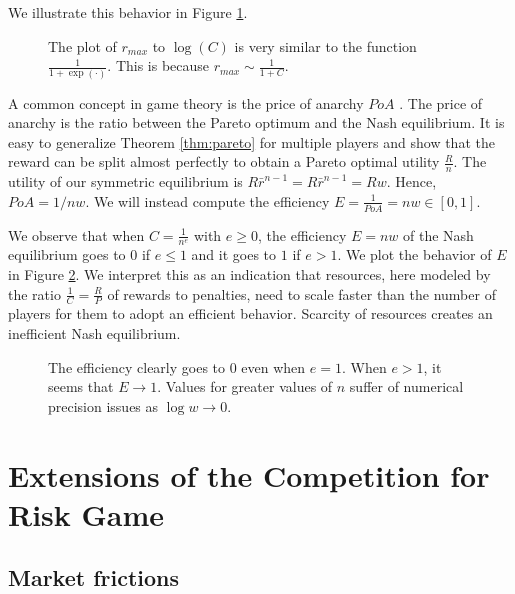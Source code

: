 \documentclass[preprint,12pt,authoryear]{elsarticle}
\theoremstyle{definition}
\begin{document}
We illustrate this behavior in Figure \ref{fig:cutoff-asymptotic}.

\begin{figure}[htbp]
    \centering
    
    \caption{The plot of $r_{max}$ to $\log(C)$ is very similar to the function $\frac{1}{1 + \exp(\cdot)}$. This is because $r_{max} \sim \frac{1}{1+C}$.}
    \label{fig:cutoff-asymptotic}
\end{figure}



A common concept in game theory is the price of anarchy $PoA$ \citep{koutsoupias1999worst}. The price of anarchy is the ratio between the Pareto optimum and the Nash equilibrium. It is easy to generalize Theorem \ref{thm:pareto} for multiple players and show that the reward can be split almost perfectly to obtain a Pareto optimal utility $\frac{R}{n}$. The utility of our symmetric equilibrium is $R \bar r ^ {n-1} = R \bar r ^ {n-1} = R w$. Hence, $PoA = 1 / n w$. We will instead compute the efficiency $E = \frac{1}{PoA} = n w \in [0,1]$.


We observe that when $C = \frac{1}{n^e}$ with $e \ge 0$, the efficiency $E = n w$ of the Nash equilibrium goes to $0$ if $e \le 1$ and it goes to $1$ if $e > 1$. We plot the behavior of $E$ in Figure \ref{fig:efficiency}.
We interpret this as an indication that resources, here modeled by the ratio $\frac{1}{C} = \frac{R}{P}$ of rewards to penalties, need to scale faster than the number of players for them to adopt an efficient behavior. Scarcity of resources creates an inefficient Nash equilibrium.

\begin{figure}[htbp]
    \centering
    
    \caption{The efficiency clearly goes to $0$ even when $e = 1$. When $e>1$, it seems that $E \rightarrow 1$. Values for greater values of $n$ suffer of numerical precision issues as $\log w \rightarrow 0$.}
    \label{fig:efficiency}
\end{figure}

\section{Extensions of the Competition for Risk Game}


\subsection{Market frictions}
\end{document}
